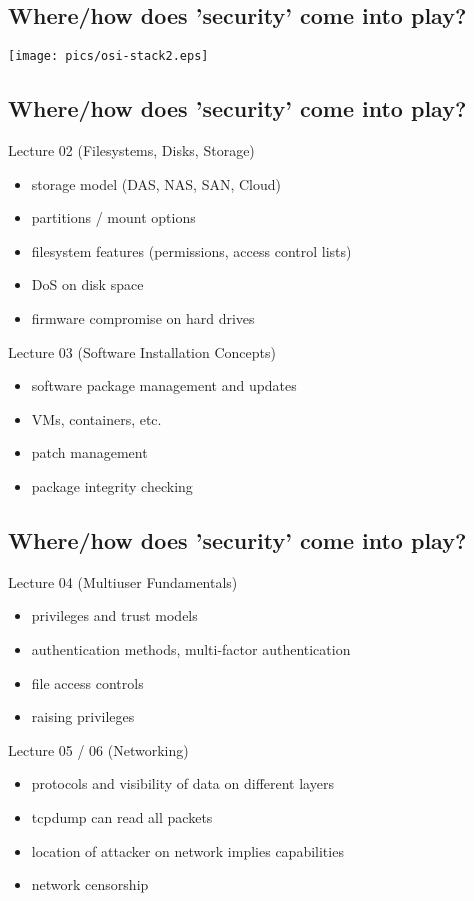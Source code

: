 \documentclass[xga]{xdvislides}
\begin{document}
\subsection{Where/how does 'security' come into play?}
\vspace*{\fill}
\begin{center}
	\texttt{[image: pics/osi-stack2.eps]} \\
\end{center}
\vspace*{\fill}

\subsection{Where/how does 'security' come into play?}
Lecture 02 (Filesystems, Disks, Storage)
\begin{itemize}
	\item storage model (DAS, NAS, SAN, Cloud)
	\item partitions / mount options
	\item filesystem features (permissions, access control lists)
	\item DoS on disk space
	\item firmware compromise on hard drives
\end{itemize}
\vspace{.5in}
Lecture 03 (Software Installation Concepts)
\begin{itemize}
	\item software package management and updates
	\item VMs, containers, etc.
	\item patch management
	\item package integrity checking
\end{itemize}

\subsection{Where/how does 'security' come into play?}
Lecture 04 (Multiuser Fundamentals)
\begin{itemize}
	\item privileges and trust models
	\item authentication methods, multi-factor authentication
	\item file access controls
	\item raising privileges
\end{itemize}
\vspace{.5in}
Lecture 05 / 06 (Networking)
\begin{itemize}
	\item protocols and visibility of data on different layers
	\item tcpdump can read all packets
	\item location of attacker on network implies capabilities
	\item network censorship
\end{itemize}
\end{document}
